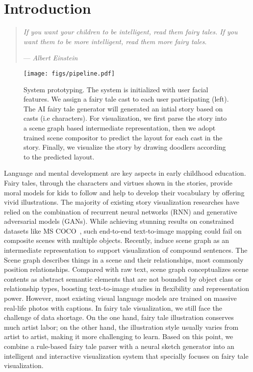 \section{Introduction}
\begin{quote}
\textit{If you want your children to be intelligent, read them fairy tales. If you want them to be more intelligent, read them more fairy tales}.\\
\begin{flushright}
--- \textit{Albert Einstein}
\end{flushright}
\end{quote}

\begin{figure*}[t]
\begin{center}
   \texttt{[image: figs/pipeline.pdf]}
\end{center}
\caption{System prototyping. The system is initialized with user facial features. We assign a fairy tale cast to each user participating (left). The AI fairy tale generator will generated an intial story based on casts (i.e characters). For visualization, we first parse the story into a scene graph based intermediate representation, then we adopt trained scene compositor to predict the layout for each cast in the story. Finally, we visualize the story by drawing doodlers according to the predicted layout.}
\label{fig:sys_proto}
\end{figure*}

Language and mental development are key aspects in early childhood education. Fairy tales, through the characters and virtues shown in the stories, provide moral models for kids to follow and help to develop their vocabulary by offering vivid illustrations. The majority of existing story visualization researches \cite{Gregor2015DRAWAR,Johnson,Johnson2018,Li2019ObjectDrivenTS,Liu2020,Rose2010} have relied on the combination of recurrent neural networks (RNN) and generative adversarial models (GANs). While achieving stunning results on constrained datasets like MS COCO~\cite{}, such end-to-end text-to-image mapping could fail on composite scenes with multiple objects. 
Recently, \cite{Herzig2019,Huang2019,Mirza2014} induce scene graph as an intermediate representation to support visualization of compound sentences. The Scene graph \cite{Johnson} describes things in a scene and their relationships, most commonly position relationships. Compared with raw text, scene graph conceptualizes scene contents as abstract semantic elements that are not bounded by object class or relationship types, boosting text-to-image studies in flexibility and representation power.
%
However, most existing visual language models are trained on massive real-life photos with captions. In fairy tale visualization, we still face the challenge of data shortage. On the one hand, fairy tale illustration conserves much artist labor; on the other hand, the illustration style usually varies from artist to artist, making it more challenging to learn. Based on this point, we combine a rule-based fairy tale parser with a neural sketch generator into an intelligent and interactive visualization system that specially focuses on fairy tale visualization.

